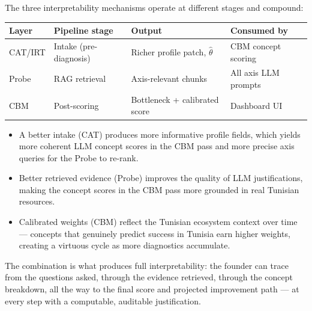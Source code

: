 \documentclass[11pt,a4paper]{article}
\begin{document}
The three interpretability mechanisms operate at different stages and compound:

\begin{center}\small
\begin{tabular}{@{}llll@{}}
\toprule
\textbf{Layer} & \textbf{Pipeline stage} & \textbf{Output} & \textbf{Consumed by} \\
\midrule
CAT/IRT  & Intake (pre-diagnosis) & Richer profile patch, $\hat{\theta}$ & CBM concept scoring \\
Probe    & RAG retrieval          & Axis-relevant chunks                 & All axis LLM prompts \\
CBM      & Post-scoring           & Bottleneck + calibrated score        & Dashboard UI \\
\bottomrule
\end{tabular}
\end{center}

\begin{itemize}
  \item A better intake (CAT) produces more informative profile fields, which yields
        more coherent LLM concept scores in the CBM pass and more precise axis queries
        for the Probe to re-rank.
  \item Better retrieved evidence (Probe) improves the quality of LLM justifications,
        making the concept scores in the CBM pass more grounded in real Tunisian resources.
  \item Calibrated weights (CBM) reflect the Tunisian ecosystem context over time —
        concepts that genuinely predict success in Tunisia earn higher weights, creating
        a virtuous cycle as more diagnostics accumulate.
\end{itemize}

The combination is what produces full interpretability: the founder can trace from the
questions asked, through the evidence retrieved, through the concept breakdown, all the
way to the final score and projected improvement path — at every step with a computable,
auditable justification.
\end{document}
